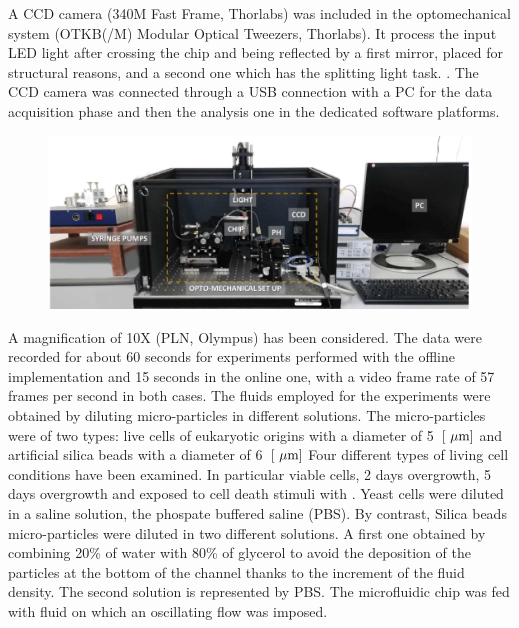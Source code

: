 \documentclass[journal]{IEEEtran}
\theoremstyle{definition}
\theoremstyle{remark}
\begin{document}
A CCD camera (340M Fast Frame, Thorlabs) was included in the optomechanical system (OTKB(/M) Modular Optical Tweezers, Thorlabs). It process the input LED light after crossing the chip and being reflected by a first mirror, placed for structural reasons, and a second one which has the splitting light task. . The CCD camera was connected through a USB connection with a PC for the data acquisition phase and then the analysis one in the dedicated software platforms. 

\begin{figure}[h]
	\centering
	\includegraphics[width=1\columnwidth]{images/setup}
\end{figure}
A magnification of 10X (PLN, Olympus) has been considered.  
The data were recorded for about 60 seconds for experiments performed with the offline implementation and 15 seconds in the online one, with a video frame rate of 57 frames per second in both cases.
The fluids employed for the experiments were obtained by diluting micro-particles in different solutions. The micro-particles were of two types: live cells of eukaryotic origins with a diameter of 5~$[\rm~\mu m]$ and artificial silica beads with a diameter of 6~$[\rm~\mu m]$  Four different types of living cell conditions have been examined. In particular viable cells, 2 days overgrowth, 5 days overgrowth and exposed to cell death stimuli with .  
Yeast cells were diluted in a saline solution, the phospate buffered saline (PBS). By contrast, Silica beads micro-particles were diluted in two different solutions. A first one obtained by combining 20\% of water with 80\% of glycerol to avoid the deposition of the particles at the bottom of the channel thanks to the increment of the fluid density. The second solution is represented by PBS.
The microfluidic chip was fed with fluid on which an oscillating flow was imposed.
\end{document}

